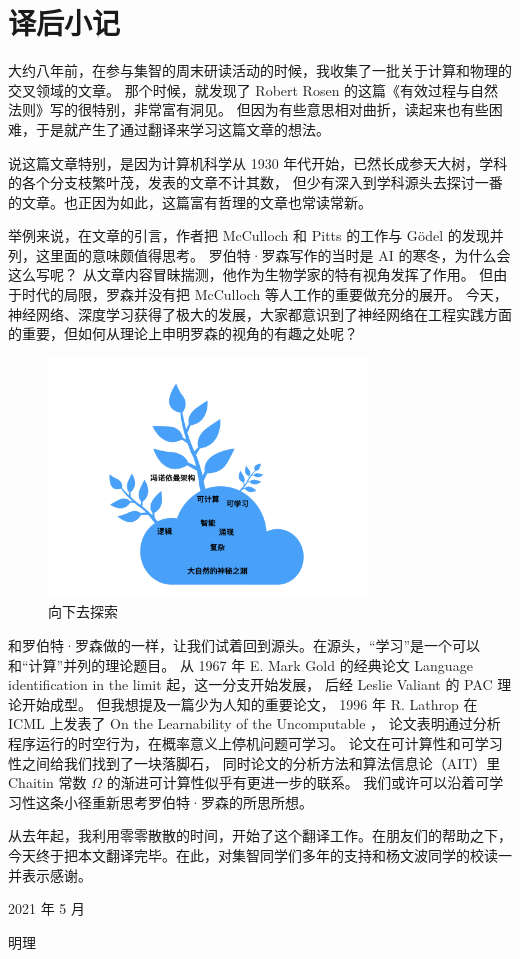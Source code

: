 \documentclass[a4paper,12pt]{article}
\begin{document}
\newpage
{}
{}



\newpage
{}
{}
\printindex
\printglossaries

\newpage
\appendix
\section{译后小记}

大约八年前，在参与集智的周末研读活动的时候，我收集了一批关于计算和物理的交叉领域的文章。
那个时候，就发现了 Robert Rosen 的这篇《有效过程与自然法则》写的很特别，非常富有洞见。
但因为有些意思相对曲折，读起来也有些困难，于是就产生了通过翻译来学习这篇文章的想法。

说这篇文章特别，是因为计算机科学从 1930 年代开始，已然长成参天大树，学科的各个分支枝繁叶茂，发表的文章不计其数，
但少有深入到学科源头去探讨一番的文章。也正因为如此，这篇富有哲理的文章也常读常新。

举例来说，在文章的引言，作者把 McCulloch 和 Pitts 的工作与 G{\"o}del 的发现并列，这里面的意味颇值得思考。
罗伯特·罗森写作的当时是 AI 的寒冬，为什么会这么写呢？ 从文章内容冒昧揣测，他作为生物学家的特有视角发挥了作用。
但由于时代的局限，罗森并没有把 McCulloch 等人工作的重要做充分的展开。
今天，神经网络、深度学习获得了极大的发展，大家都意识到了神经网络在工程实践方面的重要，但如何从理论上申明罗森的视角的有趣之处呢？

\begin{figure}[ht]
\centering
\includegraphics[height=2.5in]{images/landscape.png}
\caption{向下去探索}
\end{figure}

和罗伯特·罗森做的一样，让我们试着回到源头。在源头，“学习”是一个可以和“计算”并列的理论题目。
从 1967 年 E. Mark Gold 的经典论文 Language identification in the limit 起，这一分支开始发展， 后经 Leslie Valiant 的 PAC 理论开始成型。
但我想提及一篇少为人知的重要论文， 1996 年 R. Lathrop 在 ICML 上发表了 On the Learnability of the Uncomputable ，
论文表明通过分析程序运行的时空行为，在概率意义上停机问题可学习。 论文在可计算性和可学习性之间给我们找到了一块落脚石，
同时论文的分析方法和算法信息论（AIT）里 Chaitin 常数 $\Omega$ 的渐进可计算性似乎有更进一步的联系。
我们或许可以沿着可学习性这条小径重新思考罗伯特·罗森的所思所想。

从去年起，我利用零零散散的时间，开始了这个翻译工作。在朋友们的帮助之下，今天终于把本文翻译完毕。在此，对集智同学们多年的支持和杨文波同学的校读一并表示感谢。

\hfill \hfill 2021 年 5 月

\hfill \hfill 明理
\end{document}
